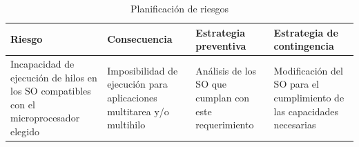 		\newpage
		\begin{table}[!h]
		\centering
		\begin{tabular}{ p{4cm} p{4cm} p{4cm} p{3cm} }
		\hline 
		\rowcolor[gray]{0.8} Riesgo & Consecuencia & Estrategia preventiva & Estrategia de contingencia\\
		\hline
		Incapacidad de ejecución de hilos en los SO compatibles con el microprocesador elegido &  Imposibilidad de ejecución para aplicaciones multitarea y/o multihilo & Análisis de los SO que cumplan con este requerimiento & Modificación del SO para el cumplimiento de las capacidades necesarias\\
		\hline
		\end{tabular}
		\caption{Planificación de riesgos}
		\label{tab:planificación}
		\end{table}
		
	